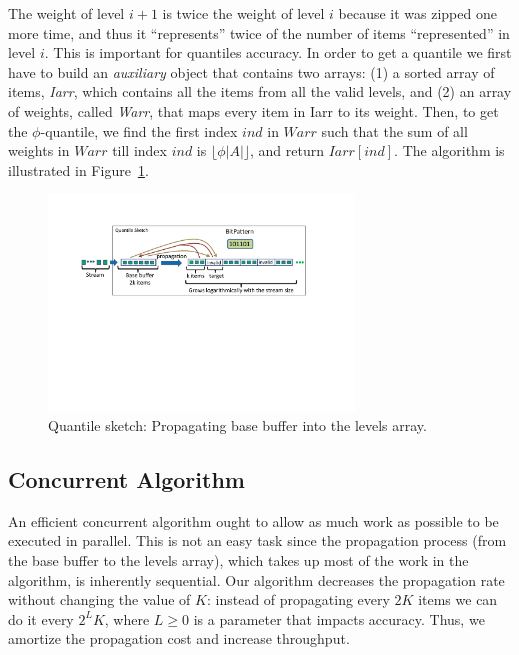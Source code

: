 The weight of level $i+1$ is twice the weight of level
$i$ because it was zipped one more time, and thus it
``represents'' twice of the number of items ``represented'' in
level $i$.
This is important for quantiles accuracy.
In order to get a quantile we first have to build an
\emph{auxiliary} object that contains two arrays: 
(1) a sorted array of items, \emph{Iarr}, which 
contains all the items from all the valid levels, and (2) an
array of weights, called \emph{Warr}, that maps every item in
Iarr to its weight.
Then, to get the $\phi$-quantile, we %
find the first index $ind$ in $Warr$ such that the
sum of all weights in $Warr$ till index $ind$ is $\lfloor \phi |A|
\rfloor$, and return $Iarr[ind]$. The algorithm is illustrated in
Figure~\ref{fig:quantilesMerge}.

\begin{figure}[tb]
    \centering
    \includegraphics[width=3.2in]{images/quantilesPropogation.pdf}
    \caption{Quantile sketch: Propagating base buffer
    into the levels array.}
    \label{fig:quantilesMerge}
\end{figure}


\subsection{Concurrent Algorithm}

An efficient concurrent algorithm ought to allow  as much work as possible to be executed in parallel.
This is not an easy task since the propagation process (from the base buffer to the levels
array), which takes up most of the work in the algorithm, is
inherently sequential.
Our algorithm decreases the propagation rate without changing
the value of $K$: instead of propagating every $2K$ items we can
do it every $2^{L}K$, where $L \geq 0$ is a parameter that
impacts accuracy. Thus, we amortize the propagation cost and  increase
throughput.

